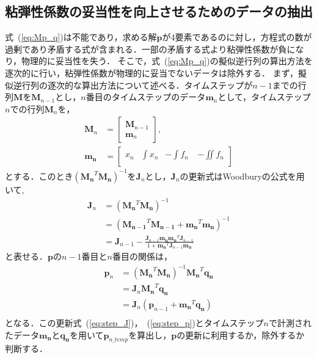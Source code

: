 \documentclass[a4paper]{jarticle}
\begin{document}
\subsection{粘弾性係数の妥当性を向上させるためのデータの抽出}\label{subsec:downsample}
式~(\ref{eq:Mp_q})は不能であり，求める解$\mathbf{p}$が4要素であるのに対し，方程式の数が過剰であり矛盾する式が含まれる．一部の矛盾する式より粘弾性係数が負になり，物理的に妥当性を失う．
そこで，式~(\ref{eq:Mp_q})の擬似逆行列の算出方法を逐次的に行い，粘弾性係数が物理的に妥当でないデータは除外する．
まず，擬似逆行列の逐次的な算出方法について述べる．タイムステップが$n-1$までの行列$\mathbf{M}$を$\mathbf{M}_{n-1}$とし，$n$番目のタイムステップのデータ$\mathbf{m}_n$として，タイムステップ$n$での行列$\mathbf{M}_n$を，
\begin{equation}
    \begin{aligned}
        \mathbf{M}_n &= \begin{bmatrix}
            \mathbf{M}_{n-1} \\
            \mathbf{m}_n
        \end{bmatrix},\\
        \mathbf{m_{n}}&=\begin{bmatrix}
            x_{n} & \int{x_{n}} & -\int{f_{n}}\ & -\iint{f_{n}}\\
        \end{bmatrix}
    \end{aligned}
\end{equation}
とする．このとき$(\mathbf{M_{n}}^{T}\mathbf{M_{n}})^{-1}$を$\mathbf{J}_{n}$とし，$\mathbf{J}_{n}$の更新式はWoodburyの公式を用いて,
\begin{equation}
    \begin{aligned}
    \mathbf{J}_n &= (\mathbf{M_{n}}^{T}\mathbf{M_{n}})^{-1}\\
                 &= (\mathbf{M_{n-1}}^{T}\mathbf{M_{n-1}} + \mathbf{m_{n}}^{T}\mathbf{m_{n}})^{-1}\\
                 &= \mathbf{J}_{n-1} - \frac{\mathbf{J}_{n-1}\mathbf{m_{n}}\mathbf{m_{n}}^{T}\mathbf{J}_{n-1}}{1+\mathbf{m_{n}}^{T}\mathbf{J}_{n-1}\mathbf{m_{n}}}
    \end{aligned}
    \label{eq:step_J}
\end{equation}
と表せる．$\mathbf{p}$の$n-1$番目と$n$番目の関係は，
\begin{equation}
    \begin{aligned}
    \mathbf{p}_n &= (\mathbf{M_{n}}^{T}\mathbf{M_{n}})^{-1}\mathbf{M_{n}}^{T}\mathbf{q_{n}}\\
                 &= \mathbf{J}_{n}\mathbf{M_{n}}^{T}\mathbf{q_{n}}\\
                 &= \mathbf{J}_{n}(\mathbf{p}_{n-1}+\mathbf{m_{n}}^{T}\mathbf{q_{n}})\\
    \end{aligned}
    \label{eq:step_p}
\end{equation}
となる．この更新式~(\ref{eq:step_J})，~(\ref{eq:step_p})とタイムステップ$n$で計測されたデータ$\mathbf{m_{n}}$と$\mathbf{q_{n}}$を用いて$\mathbf{p}_{n\_temp}$を算出し，$\mathbf{p}$の更新に利用するか，除外するか判断する．
\end{document}
